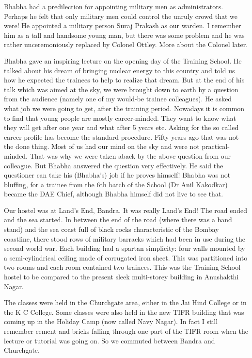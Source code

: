   Bhabha had a predilection for appointing military men as
  administrators. Perhaps he felt that only military men could
  control the unruly crowd that we were! He appointed a military
  person Suraj Prakash as our warden. I remember him as a tall
  and handsome young man, but there was some problem and he was
  rather unceremoniously replaced by Colonel Ottley.
  More about the Colonel later.

  Bhabha gave an inspiring lecture on the opening day of the
  Training School. He talked about his dream of bringing
  nuclear energy to this country and told us how he expected
  the trainees to help to realize that dream. But at the end
  of his talk which was aimed at the sky, we were brought
  down to earth by a question from the audience (namely 
  one of my would-be trainee colleagues). He asked what job we
  were going to get, after the training period. Nowadays it
  is common to find that young people are mostly career-minded.
  They want to know what they will get after one year and what
  after 5 years etc. Asking for the so called career-profile
  has become the standard procedure. Fifty years ago that
  was not the done thing. Most of us had our mind on the sky
  and were not practical-minded. That was why we were taken
  aback by the above question from our colleague. But 
  Bhabha answered the question very effectively. He
  said the questioner can take his (Bhabha's) job if he
  proves himself! Bhabha was not bluffing, for a trainee from
  the 6th batch of the School (Dr Anil Kakodkar) became
  the DAE Chief, although Bhabha himself did not live to
  see that.

  Our hostel was at Land's End, Bandra. It was really Land's
  End! The road ended and the sea started. In between the end of
  the road (where there was a band stand) and the sea coast
  full of black rocks characteristic of the Bombay coastline,
  there stood rows of military barracks which had been in use
  during the second world war. Each building had a spartan
  simplicity: four walls mounted by a semi-cylindrical ceiling made of
  corrugated iron sheet. This was partitioned into two rooms
  and each room contained two trainees. This was the Training
  School hostel to be compared to the present sleek
  multi-storey building in Anushakthi Nagar.

  The classes were held in the Churchgate area, either in the
  Jai Hind College or in the K C College. Some classes were
  also held in the new TIFR building that was coming up in
  the Holiday Camp (now called Navy Nagar). In fact I still
  remember cement and bricks falling through one part of
  the TIFR room when the lecture or tutorial was going on.
  So we commuted between Bandra and Churchgate.

